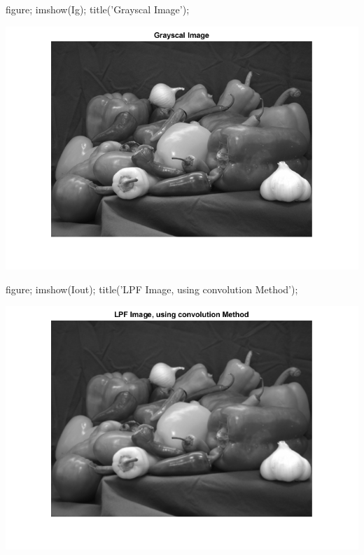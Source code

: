 \documentclass[12pt, onecolumn]{IEEEtran}
\begin{document}


\vspace{1em}
\begin{matlabcode}
figure; imshow(Ig); title('Grayscal Image'); %
\end{matlabcode}
\begin{center}
\includegraphics[width=\maxwidth{69.44305067737079em}]{figure_14.png}
\end{center}
\begin{matlabcode}
figure; imshow(Iout); title('LPF Image, using convolution Method'); %
\end{matlabcode}
\begin{center}
\includegraphics[width=\maxwidth{69.44305067737079em}]{figure_15.png}
\end{center}
\end{document}
